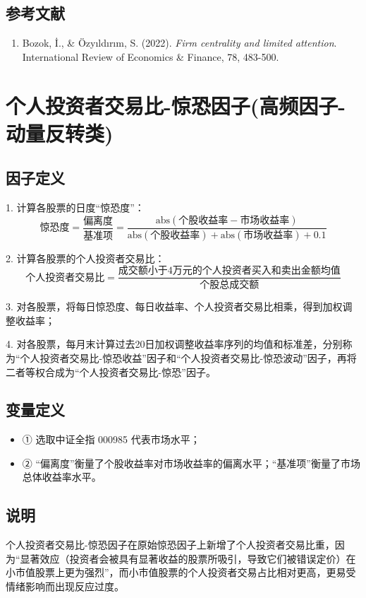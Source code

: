 \documentclass{article}
\begin{document}
\subsection{参考文献}
\begin{enumerate}
    \item Bozok, İ., \& Özyıldırım, S. (2022). \textit{Firm centrality and limited attention}. International Review of Economics \& Finance, 78, 483-500.
\end{enumerate}

\section{个人投资者交易比-惊恐因子(高频因子-动量反转类)}

\subsection{因子定义}

1. 计算各股票的日度“惊恐度”：
\begin{equation}
    \text{惊恐度} = \frac{\text{偏离度}}{\text{基准项}} = \frac{\mathrm{abs}(\text{个股收益率} - \text{市场收益率})}{\mathrm{abs}(\text{个股收益率}) + \mathrm{abs}(\text{市场收益率}) + 0.1}
\end{equation}

2. 计算各股票的个人投资者交易比：
\begin{equation}
    \text{个人投资者交易比} = \frac{\text{成交额小于4万元的个人投资者买入和卖出金额均值}}{\text{个股总成交额}}
\end{equation}

3. 对各股票，将每日惊恐度、每日收益率、个人投资者交易比相乘，得到加权调整收益率；

4. 对各股票，每月末计算过去20日加权调整收益率序列的均值和标准差，分别称为“个人投资者交易比-惊恐收益”因子和“个人投资者交易比-惊恐波动”因子，再将二者等权合成为“个人投资者交易比-惊恐”因子。

\subsection{变量定义}
\begin{itemize}
    \item ① 选取中证全指 000985 代表市场水平；
    \item ② “偏离度”衡量了个股收益率对市场收益率的偏离水平；“基准项”衡量了市场总体收益率水平。
\end{itemize}

\subsection{说明}
个人投资者交易比-惊恐因子在原始惊恐因子上新增了个人投资者交易比重，因为“显著效应（投资者会被具有显著收益的股票所吸引，导致它们被错误定价）在小市值股票上更为强烈”，而小市值股票的个人投资者交易占比相对更高，更易受情绪影响而出现反应过度。
\end{document}
